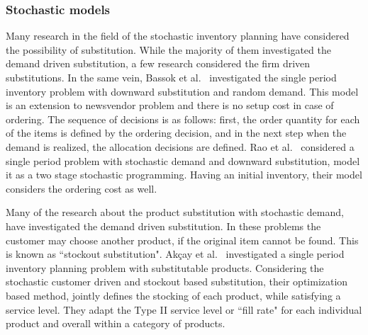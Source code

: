 \documentclass[10pt]{article}
\begin{document}
\subsubsection{Stochastic models}
Many research in the field of the stochastic inventory planning have considered the possibility of substitution. While the majority of them investigated the demand driven substitution, a few research considered the firm driven substitutions. In the same vein, Bassok et al.~\cite{bassok1999single} investigated the single period inventory problem with downward substitution and random demand. This model is an extension to newsvendor problem and there is no setup cost in case of ordering. The sequence of decisions is as follows: first, the order quantity for each of the items is defined by the ordering decision, and in the next step when the demand is realized, the allocation decisions are defined. Rao et al.~\cite{rao2004multi} considered a single period problem with stochastic demand and downward substitution, model it as a two stage stochastic programming. Having an initial inventory, their model considers the ordering cost as well.  

Many of the research about the  product substitution with stochastic demand, have investigated the demand driven substitution. In these problems the customer may choose another product, if the original item cannot be found. This is known as ``stockout substitution". Akçay et al.~\cite{akccaycategory} investigated a single period inventory planning problem with substitutable products. Considering the stochastic customer driven and stockout based substitution, their optimization based method, jointly defines the stocking of each product, while satisfying a service level. They adapt the Type II service level or ``fill rate" for each individual product and overall within a category of products.  
\end{document}
